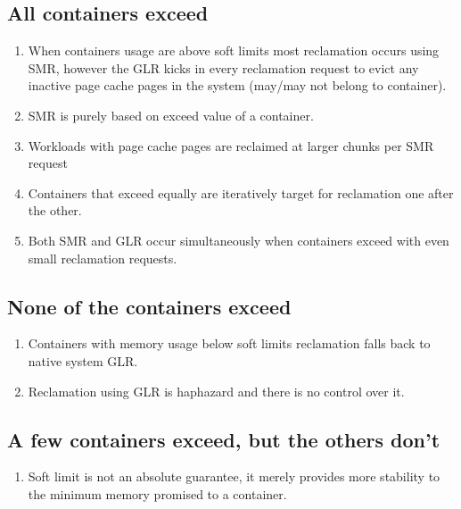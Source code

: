    \subsection{All containers exceed}
    \begin{enumerate}
      \item When containers usage are above soft limits most reclamation occurs using SMR, however the GLR kicks in every reclamation 
request to evict any  inactive page cache pages in the system (may/may not belong to container).      
      \item SMR is purely based on exceed value of a container.
      \item Workloads with page cache pages are reclaimed at larger chunks per SMR request
      \item Containers that exceed equally are iteratively target for reclamation one after the other.
      \item Both SMR and GLR occur simultaneously when containers exceed with even small reclamation requests.      
    \end{enumerate}
    
    \subsection{None of the containers exceed}
    \begin{enumerate}
      \item Containers with memory usage below soft limits reclamation falls back to native system GLR.
      \item Reclamation using GLR is haphazard and there is no control over it. 
    \end{enumerate}
    
    \subsection{A few containers exceed, but the others don’t}
    \begin{enumerate}
      \item Soft limit is not an absolute guarantee, it merely provides more stability to the minimum memory promised to a container.
    \end{enumerate}

  
